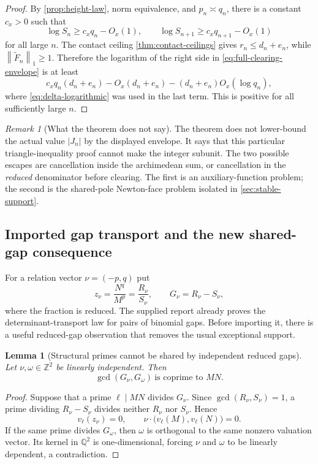 \documentclass[11pt,oneside]{article}
\newtheorem{lemma}[theorem]{Lemma}
\theoremstyle{definition}
\theoremstyle{remark}
\newtheorem{remark}[theorem]{Remark}
\newcommand{\Z}{\mathbb Z}
\newcommand{\Q}{\mathbb Q}
\newcommand{\normone}[1]{\left\lVert #1\right\rVert_1}
\begin{document}
\begin{proof}
By \cref{prop:height-law}, norm equivalence, and $p_n\asymp q_n$, there is a constant
$c_x>0$ such that
\[
 \log S_n\ge c_xq_n-O_x(1),
 \qquad
 \log S_{n+1}\ge c_xq_{n+1}-O_x(1)
\]
for all large $n$.  The contact ceiling \cref{thm:contact-ceilings} gives
$r_n\le d_n+e_n$, while $\normone{\widetilde F_n}\ge1$.  Therefore the logarithm of the
right side in \eqref{eq:full-clearing-envelope} is at least
\[
 c_xq_n(d_n+e_n)-O_x(d_n+e_n)
 -(d_n+e_n)O_x(\log q_n),
\]
where \eqref{eq:delta-logarithmic} was used in the last term.  This is positive for all
sufficiently large $n$.
\end{proof}

\begin{remark}[What the theorem does not say]
The theorem does not lower-bound the actual value $|J_n|$ by the displayed envelope.  It says
that this particular triangle-inequality proof cannot make the integer subunit.  The two
possible escapes are cancellation inside the archimedean sum, or cancellation in the
\emph{reduced} denominator before clearing.  The first is an auxiliary-function problem; the second is the shared-pole
Newton-face problem isolated in \cref{sec:stable-support}.
\end{remark}

\subsection{Imported gap transport and the new shared-gap consequence}

For a relation vector $\nu=(-p,q)$ put
\[
 z_\nu=\frac{N^q}{M^p}=\frac{R_\nu}{S_\nu},
 \qquad
 G_\nu=R_\nu-S_\nu,
\]
where the fraction is reduced.  The supplied report already proves the determinant-transport
law for pairs of binomial gaps.  Before importing it, there is a useful reduced-gap
observation that removes the usual exceptional support.

\begin{lemma}[Structural primes cannot be shared by independent reduced gaps]
\label{lem:structural-primes-not-shared}
Let $\nu,\omega\in\Z^2$ be linearly independent.  Then
\begin{equation}
 \gcd(G_\nu,G_\omega)\ \text{is coprime to }MN.
 \label{eq:structural-primes-not-shared}
\end{equation}
\end{lemma}

\begin{proof}
Suppose that a prime $\ell\mid MN$ divides $G_\nu$.  Since
$\gcd(R_\nu,S_\nu)=1$, a prime dividing $R_\nu-S_\nu$ divides neither
$R_\nu$ nor $S_\nu$.  Hence
\[
 v_\ell(z_\nu)=0,
 \qquad
 \nu\cdot\bigl(v_\ell(M),v_\ell(N)\bigr)=0.
\]
If the same prime divides $G_\omega$, then $\omega$ is orthogonal to the same nonzero
valuation vector.  Its kernel in $\Q^2$ is one-dimensional, forcing $\nu$ and $\omega$ to be
linearly dependent, a contradiction.
\end{proof}
\end{document}
